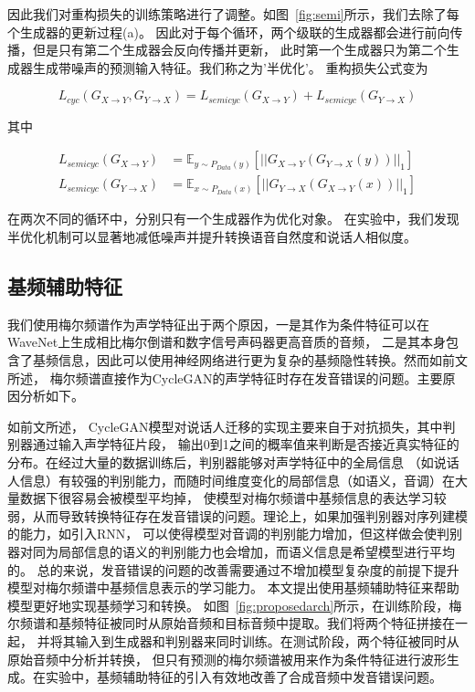 因此我们对重构损失的训练策略进行了调整。如图~\ref{fig:semi}所示，我们去除了每个生成器的更新过程(a)。
因此对于每个循环，两个级联的生成器都会进行前向传播，但是只有第二个生成器会反向传播并更新，
此时第一个生成器只为第二个生成器生成带噪声的预测输入特征。我们称之为’半优化’。
重构损失公式变为

\begin{equation}
    L_{cyc}(G_{X\rightarrow Y},G_{Y\rightarrow X}) = L_{semicyc}(G_{X\rightarrow Y}) + L_{semicyc}(G_{Y\rightarrow X})
\end{equation}

其中

\begin{align}
    L_{semicyc}(G_{X\rightarrow Y}) & = \mathbb{E}_{y\sim P_{Data}(y)}\left[ \left| \left| G_{X\rightarrow Y}(G_{Y\rightarrow X}(y)) \right| \right|_1 \right] \\
    L_{semicyc}(G_{Y\rightarrow X}) & = \mathbb{E}_{x\sim P_{Data}(x)}\left[ \left| \left| G_{Y\rightarrow X}(G_{X\rightarrow Y}(x)) \right| \right|_1 \right]
\end{align}

在两次不同的循环中，分别只有一个生成器作为优化对象。
在实验中，我们发现半优化机制可以显著地减低噪声并提升转换语音自然度和说话人相似度。

\subsection{基频辅助特征}

我们使用梅尔频谱作为声学特征出于两个原因，一是其作为条件特征可以在WaveNet上生成相比梅尔倒谱和数字信号声码器更高音质的音频，
二是其本身包含了基频信息，因此可以使用神经网络进行更为复杂的基频隐性转换。然而如前文所述，
梅尔频谱直接作为CycleGAN的声学特征时存在发音错误的问题。主要原因分析如下。

如前文所述，
CycleGAN模型对说话人迁移的实现主要来自于对抗损失，其中判别器通过输入声学特征片段，
输出0到1之间的概率值来判断是否接近真实特征的分布。在经过大量的数据训练后，判别器能够对声学特征中的全局信息
（如说话人信息）有较强的判别能力，而随时间维度变化的局部信息（如语义，音调）在大量数据下很容易会被模型平均掉，
使模型对梅尔频谱中基频信息的表达学习较弱，从而导致转换特征存在发音错误的问题。理论上，如果加强判别器对序列建模的能力，如引入RNN，
可以使得模型对音调的判别能力增加，但这样做会使判别器对同为局部信息的语义的判别能力也会增加，而语义信息是希望模型进行平均的。
总的来说，发音错误的问题的改善需要通过不增加模型复杂度的前提下提升模型对梅尔频谱中基频信息表示的学习能力。
本文提出使用基频辅助特征来帮助模型更好地实现基频学习和转换。
如图~\ref{fig:proposedarch}所示，在训练阶段，梅尔频谱和基频特征被同时从原始音频和目标音频中提取。我们将两个特征拼接在一起，
并将其输入到生成器和判别器来同时训练。在测试阶段，两个特征被同时从原始音频中分析并转换，
但只有预测的梅尔频谱被用来作为条件特征进行波形生成。在实验中，基频辅助特征的引入有效地改善了合成音频中发音错误问题。

